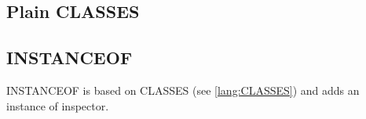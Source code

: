 \documentclass[../codeprint.tex]{subfiles}
\begin{document}
\subsection{Plain CLASSES}
\label{lang:CLASSES}



\subsection{INSTANCEOF}
INSTANCEOF is based on CLASSES (see \autoref{lang:CLASSES}) and adds an instance of inspector.


\end{document}
